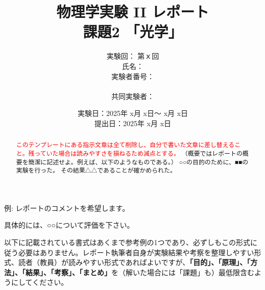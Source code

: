 \documentclass[uplatex,dvipdfmx,a4j,12pt]{jsarticle}
\title{
  物理学実験 II レポート\\    %
  課題2 「光学」
  }
\author{
  実験回： 第ｘ回 \\
  氏名： \\
  実験者番号： \\
\\
  共同実験者：
  }
\date{実験日：2025年 x月 x日～ x月 x日 \\
提出日：2025年 x月 x日}  %
\begin{document}
\maketitle


\vspace{2em}
\begin{center}
    \begin{minipage}{0.5\linewidth}
        例: レポートのコメントを希望します。

        具体的には、○○について評価を下さい。
    \end{minipage}
\end{center}

\vspace{5em}  


\begin{abstract}
    \textcolor{red}{このテンプレートにある指示文章は全て削除し、自分で書いた文章に差し替えること。残っていた場合は読みやすさを損ねるため減点とする。}
    （概要ではレポートの概要を簡潔に記述せよ。例えば、以下のようなものである。）
    ○○の目的のために、■■の実験を行った。
    その結果△△であることが確かめられた。
\end{abstract}

\newpage

以下に記載されている書式はあくまで参考例の1つであり、必ずしもこの形式に従う必要はありません。レポート執筆者自身が実験結果や考察を整理しやすい形式、読者（教員）が読みやすい形式であればよいですが、\textbf{「目的」、「原理」、「方法」、「結果」、「考察」、「まとめ」}を（解いた場合には「課題」も）最低限含むようにしてください。
\end{document}

